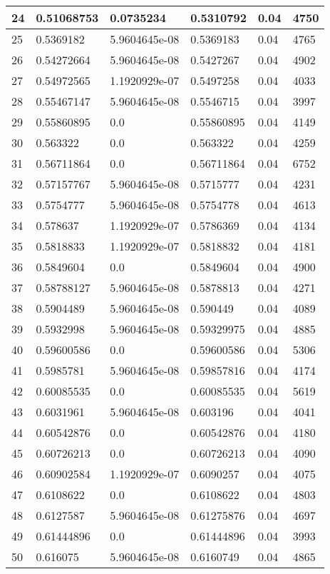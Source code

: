 \begin{longtable}{|l|l|l|l|l|l|}
24 & 0.51068753 & 0.0735234 & 0.5310792 & 0.04 & 4750 \\ \hline 
25 & 0.5369182 & 5.9604645e-08 & 0.5369183 & 0.04 & 4765 \\ \hline 
26 & 0.54272664 & 5.9604645e-08 & 0.5427267 & 0.04 & 4902 \\ \hline 
27 & 0.54972565 & 1.1920929e-07 & 0.5497258 & 0.04 & 4033 \\ \hline 
28 & 0.55467147 & 5.9604645e-08 & 0.5546715 & 0.04 & 3997 \\ \hline 
29 & 0.55860895 & 0.0 & 0.55860895 & 0.04 & 4149 \\ \hline 
30 & 0.563322 & 0.0 & 0.563322 & 0.04 & 4259 \\ \hline 
31 & 0.56711864 & 0.0 & 0.56711864 & 0.04 & 6752 \\ \hline 
32 & 0.57157767 & 5.9604645e-08 & 0.5715777 & 0.04 & 4231 \\ \hline 
33 & 0.5754777 & 5.9604645e-08 & 0.5754778 & 0.04 & 4613 \\ \hline 
34 & 0.578637 & 1.1920929e-07 & 0.5786369 & 0.04 & 4134 \\ \hline 
35 & 0.5818833 & 1.1920929e-07 & 0.5818832 & 0.04 & 4181 \\ \hline 
36 & 0.5849604 & 0.0 & 0.5849604 & 0.04 & 4900 \\ \hline 
37 & 0.58788127 & 5.9604645e-08 & 0.5878813 & 0.04 & 4271 \\ \hline 
38 & 0.5904489 & 5.9604645e-08 & 0.590449 & 0.04 & 4089 \\ \hline 
39 & 0.5932998 & 5.9604645e-08 & 0.59329975 & 0.04 & 4885 \\ \hline 
40 & 0.59600586 & 0.0 & 0.59600586 & 0.04 & 5306 \\ \hline 
41 & 0.5985781 & 5.9604645e-08 & 0.59857816 & 0.04 & 4174 \\ \hline 
42 & 0.60085535 & 0.0 & 0.60085535 & 0.04 & 5619 \\ \hline 
43 & 0.6031961 & 5.9604645e-08 & 0.603196 & 0.04 & 4041 \\ \hline 
44 & 0.60542876 & 0.0 & 0.60542876 & 0.04 & 4180 \\ \hline 
45 & 0.60726213 & 0.0 & 0.60726213 & 0.04 & 4090 \\ \hline 
46 & 0.60902584 & 1.1920929e-07 & 0.6090257 & 0.04 & 4075 \\ \hline 
47 & 0.6108622 & 0.0 & 0.6108622 & 0.04 & 4803 \\ \hline 
48 & 0.6127587 & 5.9604645e-08 & 0.61275876 & 0.04 & 4697 \\ \hline 
49 & 0.61444896 & 0.0 & 0.61444896 & 0.04 & 3993 \\ \hline 
50 & 0.616075 & 5.9604645e-08 & 0.6160749 & 0.04 & 4865 \\ \hline 
\end{longtable}